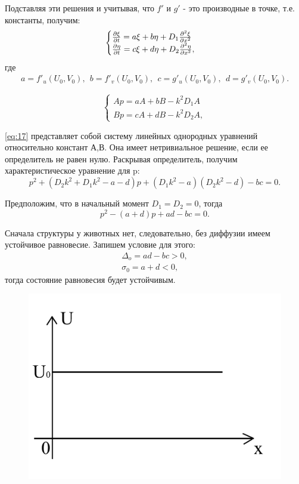 Подставляя эти решения и учитывая, что $f'$ и $g'$ - это производные в точке, т.е. константы, получим:
\begin{equation}
	\begin{cases}
		\pdv{\xi}{t}=a\xi+b\eta+D_1 \pdv[2]{\xi}{x} \\
		\pdv{\eta}{t}=c\xi+d\eta+D_2 \pdv[2]{\eta}{x},
	\end{cases}	
	\label{eq:21}
\end{equation}
где
\begin{gather*}
	a=f'_u(U_0, V_0),~~b=f'_v(U_0, V_0),~~c=g'_u(U_0, V_0),~~d=g'_v(U_0, V_0).
\end{gather*}

\begin{equation}
	\begin{cases}
		Ap=aA+bB-k^2 D_1A \\
		Bp=cA+dB-k^2 D_2A,
	\end{cases}	
	\label{eq:22}
\end{equation}

\eqref{eq:17} представляет собой систему линейных однородных уравнений относительно констант А,В. Она имеет нетривиальное решение, если ее определитель не равен нулю. Раскрывая определитель, получим характеристическое уравнение для p:
\begin{equation}
	p^2+(D_2k^2+D_1k^2-a-d)p+(D_1k^2-a)(D_2k^2-d)-bc=0.
	\label{eq:23}
\end{equation}

Предположим, что в начальный момент $D_1=D_2=0$, тогда
\begin{equation}
	p^2-(a+d)p+ad-bc=0.
	\label{eq:24}
\end{equation}

Сначала структуры у животных нет, следовательно, без диффузии имеем устойчивое равновесие. Запишем условие для этого:
\begin{gather*}
	\Delta_o=ad-bc>0, \\ \sigma_0=a+d<0,
\end{gather*}
тогда состояние равновесия будет устойчивым. 

\begin{figure}[H]
	\centering
	\includegraphics[width=0.5\linewidth]{fig/fig8.pdf}   
\end{figure}


